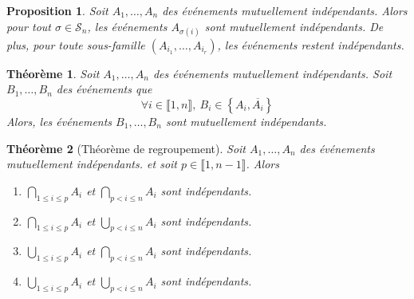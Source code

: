 \documentclass[french]{book}
\theoremstyle{plain}
\newtheorem{thm}{Théorème}[chapter]
\newtheorem{prop}{Proposition}[chapter]
\theoremstyle{definition}
\theoremstyle{remark}
\begin{document}
\begin{prop}
	Soit $A_1,\ldots,A_n$ des événements mutuellement indépendants. Alors pour tout $\sigma\in\mathcal{S}_n$, les événements $A_{\sigma(i)}$ sont mutuellement indépendants. De plus, pour toute sous-famille $(A_{i_1},\ldots,A_{i_r})$, les événements restent indépendants.
\end{prop}
\begin{thm}
	Soit $A_1,\ldots,A_n$ des événements mutuellement indépendants. Soit $B_1,\ldots,B_n$ des événements que $$\forall i\in\llbracket1,n\rrbracket, \ B_i\in\left\{A_i,\overline{A_i}\right\}$$ Alors, les événements $B_1,\ldots,B_n$ sont mutuellement indépendants.
\end{thm}
\begin{thm}[Théorème de regroupement]
	Soit $A_1,\ldots,A_n$ des événements mutuellement indépendants. et soit $p\in\llbracket1,n-1\rrbracket$. Alors
	\begin{enumerate}
		\item $\displaystyle \bigcap_{1\leqslant i\leqslant p}A_i$ et $\displaystyle \bigcap_{p<i\leqslant n}A_i$ sont indépendants.
		\item $\displaystyle \bigcap_{1\leqslant i\leqslant p}A_i$ et $\displaystyle \bigcup_{p<i\leqslant n}A_i$ sont indépendants.
		\item $\displaystyle \bigcup_{1\leqslant i\leqslant p}A_i$ et $\displaystyle \bigcap_{p<i\leqslant n}A_i$ sont indépendants.
		\item $\displaystyle \bigcup_{1\leqslant i\leqslant p}A_i$ et $\displaystyle \bigcup_{p<i\leqslant n}A_i$ sont indépendants.
	\end{enumerate}
\end{thm}
\end{document}
